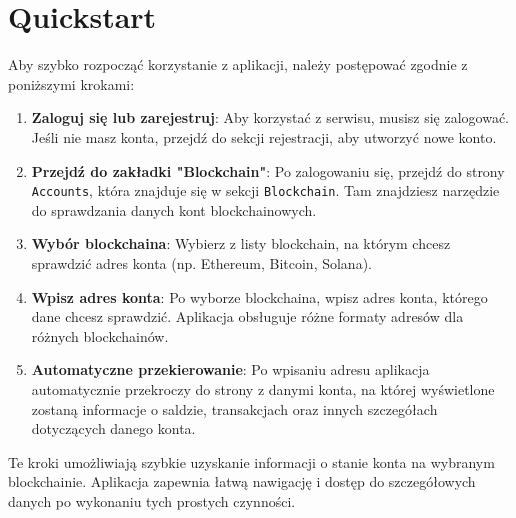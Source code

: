 \section{Quickstart}

Aby szybko rozpocząć korzystanie z aplikacji, należy postępować zgodnie z poniższymi krokami:

\begin{enumerate}
    \item \textbf{Zaloguj się lub zarejestruj}: 
    Aby korzystać z serwisu, musisz się zalogować. Jeśli nie masz konta, przejdź do sekcji rejestracji, aby utworzyć nowe konto.
    
    \item \textbf{Przejdź do zakładki "Blockchain"}: 
    Po zalogowaniu się, przejdź do strony \texttt{Accounts}, która znajduje się w sekcji \texttt{Blockchain}. Tam znajdziesz narzędzie do sprawdzania danych kont blockchainowych.
    
    \item \textbf{Wybór blockchaina}: 
    Wybierz z listy blockchain, na którym chcesz sprawdzić adres konta (np. Ethereum, Bitcoin, Solana).
    
    \item \textbf{Wpisz adres konta}: 
    Po wyborze blockchaina, wpisz adres konta, którego dane chcesz sprawdzić. Aplikacja obsługuje różne formaty adresów dla różnych blockchainów.
    
    \item \textbf{Automatyczne przekierowanie}: 
    Po wpisaniu adresu aplikacja automatycznie przekroczy do strony z danymi konta, na której wyświetlone zostaną informacje o saldzie, transakcjach oraz innych szczegółach dotyczących danego konta.
\end{enumerate}

Te kroki umożliwiają szybkie uzyskanie informacji o stanie konta na wybranym blockchainie. Aplikacja zapewnia łatwą nawigację i dostęp do szczegółowych danych po wykonaniu tych prostych czynności.
